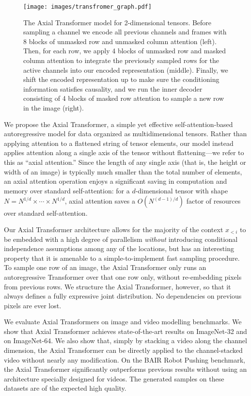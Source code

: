 \documentclass{article} \usepackage{iclr2020_conference,times}
\begin{document}
\begin{figure}[t]
    \centering
    \texttt{[image: images/transfromer\_graph.pdf]}
    \caption{The Axial Transformer model for 2-dimensional tensors. Before sampling a channel we encode all previous channels and frames with 8 blocks of unmasked row and unmasked column attention (left). Then, for each row, we apply 4 blocks of unmasked row and masked column attention to integrate the previously sampled rows for the active channels into our encoded representation (middle). Finally, we shift the encoded representation up to make sure the conditioning information satisfies causality, and we run the inner decoder consisting of 4 blocks of masked row attention to sample a new row in the image (right).}
    \label{fig:model}
\end{figure}

We propose the Axial Transformer, a simple yet effective self-attention-based autoregressive model for data organized as multidimensional tensors. Rather than applying attention to a flattened string of tensor elements, our model instead applies attention along a single axis of the tensor without flattening---we refer to this as ``axial attention.'' Since the length of any single axis (that is, the height or width of an image) is typically much smaller than the total number of elements, an axial attention operation enjoys a significant saving in computation and memory over standard self-attention: for a $d$-dimensional tensor with shape $N = N^{1/d} \times \cdots \times N^{1/d}$, axial attention saves a $O(N^{(d-1)/d})$ factor of resources over standard self-attention.



Our Axial Transformer architecture allows for the majority of the context $x_{<i}$ to be embedded with a high degree of parallelism \emph{without} introducing conditional independence assumptions among any of the locations, but has an interesting property that it is amenable to a simple-to-implement fast sampling procedure. To sample one row of an image, the Axial Transformer only runs an autoregressive Transformer over that one row only, without re-embedding pixels from previous rows. We structure the Axial Transformer, however, so that it always defines a fully expressive joint distribution. No dependencies on previous pixels are ever lost.



We evaluate Axial Transformers on image and video modelling benchmarks. We show that Axial Transformer achieves state-of-the-art results on ImageNet-32 and on ImageNet-64. We also show that, simply by stacking a video along the channel dimension, the Axial Transformer can be directly applied to the channel-stacked video without nearly any modification. On the BAIR Robot Pushing benchmark, the Axial Transformer significantly outperforms previous results without using an architecture specially designed for videos. The generated samples on these datasets are of the expected high quality.
\end{document}
